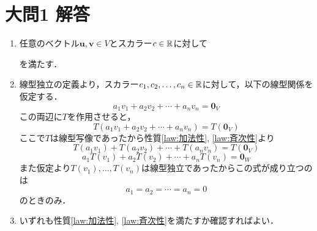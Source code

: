 \documentclass[dvipdfmx]{jsreport}
\begin{document}
\section{大問1 解答}
\begin{souanswer} %
\begin{enumerate}
	\item 任意のベクトル$\bm{u}, \bm{v}\in V$とスカラー$c\in \mathbb{R}$に対して
	を満たす．
	\item 線型独立の定義より，スカラー$c_1, c_2, \ldots, c_n\in \mathbb{R}$に対して，以下の線型関係を仮定する．
\begin{equation*}
	a_1v_1+ a_2v_2+ \cdots+ a_nv_n= \bm{0}_V
\end{equation*}
	この両辺に$T$を作用させると，
\begin{equation*}
	T(a_1v_1+ a_2v_2+ \cdots+ a_nv_n)= T(\bm{0}_V)
\end{equation*}
	ここで$T$は線型写像であったから性質\ref{law:加法性}, \ref{law:斉次性}より
\begin{equation*}
	T(a_1v_1)+ T(a_2v_2)+ \cdots+ T(a_nv_n)= T(\bm{0}_V)
\end{equation*}
\begin{equation*}
	a_1T(v_1)+ a_2T(v_2)+ \cdots+ a_nT(v_n)= \bm{0}_W
\end{equation*}
	また仮定より$T(v_1), \ldots, T(v_n)$は線型独立であったからこの式が成り立つのは
\begin{equation*}
	a_1= a_2= \cdots= a_n= 0
\end{equation*}
	のときのみ．
	\item いずれも性質\ref{law:加法性}, \ref{law:斉次性}を満たすか確認すればよい．
\end{enumerate}
\end{souanswer}
\end{document}
